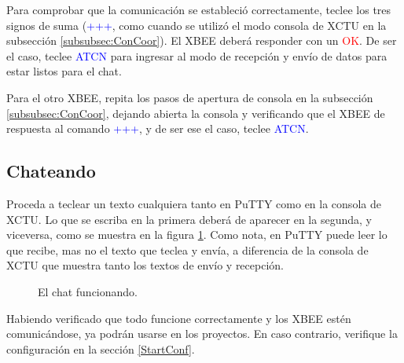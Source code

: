 Para comprobar que la comunicación se estableció correctamente, teclee los tres signos de suma (\textcolor{blue}{+++}, como cuando se utilizó el modo consola de XCTU en la subsección \ref{subsubsec:ConCoor}). El XBEE deberá responder con un \textcolor{red}{OK}. De ser el caso, teclee \textcolor{blue}{ATCN} para ingresar al modo de recepción y envío de datos para estar listos para el chat. 

Para el otro XBEE, repita los pasos de apertura de consola en la subsección \ref{subsubsec:ConCoor}, dejando abierta la consola y verificando que el XBEE de respuesta al comando \textcolor{blue}{+++}, y de ser ese el caso, teclee \textcolor{blue}{ATCN}. 

\subsection{Chateando}

Proceda a teclear un texto cualquiera tanto en PuTTY como en la consola de XCTU. Lo que se escriba en la primera deberá de aparecer en la segunda, y viceversa, como se muestra en la figura \ref{fig:Fin}. Como nota, en PuTTY puede leer lo que recibe, mas no el texto que teclea y envía, a diferencia de la consola de XCTU que muestra tanto los textos de envío y recepción. 

\begin{figure}[H] %
\caption{El chat funcionando.}
\label{fig:Fin}
\end{figure}

Habiendo verificado que todo funcione correctamente y los XBEE estén comunicándose, ya podrán usarse en los proyectos. En caso contrario, verifique la configuración en la sección \ref{StartConf}.
%